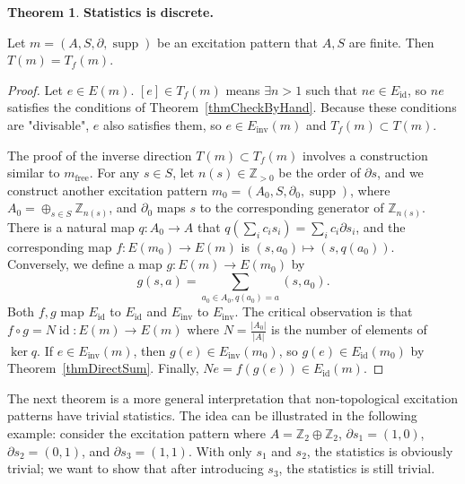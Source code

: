 \documentclass[reprint, amsmath, amssymb, showpacs, floatfix, longbibliography, aps, twocolumn, superscriptaddress, nofootinbib]{revtex4-2}
\newcommand{\ZZ}{{\mathbb Z}}
\newcommand{\supp}{\operatorname{supp}}
\theoremstyle{definition}
\newtheorem{theorem}{Theorem}[section]
\begin{document}
\begin{theorem}\label{thmFiniteOrder}
	\textbf{Statistics is discrete.}
	
	Let $m=(A,S,\partial,\supp)$ be an excitation pattern that $A,S$ are finite. Then $T(m)=T_f(m)$.
\end{theorem}
\begin{proof}
	Let $e\in E(m)$. $[e]\in T_f(m)$ means $\exists n>1$ such that $ne\in E_{\operatorname{id}}$, so $ne$ satisfies the conditions of Theorem~\ref{thmCheckByHand}. Because these conditions are "divisable", $e$ also satisfies them, so $e\in E_{\operatorname{inv}}(m)$ and $T_f(m)\subset T(m)$.
	
	The proof of the inverse direction $T(m)\subset T_f(m)$ involves a construction similar to $m_{\operatorname{free}}$. For any $s\in S$, let $n(s)\in \ZZ_{>0}$ be the order of $\partial s$, and we construct another excitation pattern $m_0=(A_0,S,\partial_0,\supp)$, where $A_0=\oplus_{s\in S}\ZZ_{n(s)}$, and $\partial_0$ maps $s$ to the corresponding generator of $\ZZ_{n(s)}$.  There is a natural map $q:A_0\rightarrow A$ that $q(\sum_ic_is_i)=\sum_ic_i\partial s_i$, and the corresponding map $f:E(m_0)\rightarrow E(m)$ is $(s,a_0)\mapsto(s,q(a_0))$. Conversely, we define a map $g: E(m)\rightarrow E(m_0)$ by
	\begin{equation}
		g(s,a)=\sum_{a_0\in A_0,q(a_0)=a}(s,a_0).
	\end{equation}
	 Both $f,g$ map $E_{\operatorname{id}}$ to $E_{\operatorname{id}}$ and $E_{\operatorname{inv}}$ to $E_{\operatorname{inv}}$. The critical observation is that $f\circ g=N\operatorname{id}: E(m)\rightarrow E(m)$ where $N=\frac{|A_0|}{|A|}$ is the number of elements of $\operatorname{ker}q$. If $e\in E_{\operatorname{inv}}(m)$, then $g(e)\in E_{\operatorname{inv}}(m_0)$, so $g(e)\in E_{\operatorname{id}}(m_0)$ by Theorem~\ref{thmDirectSum}. Finally, $Ne=f(g(e))\in E_{\operatorname{id}}(m)$.
	
\end{proof}

The next theorem is a more general interpretation that non-topological excitation patterns have trivial statistics. The idea can be illustrated in the following example: consider the excitation pattern \hbox{}
where $A=\ZZ_2\oplus\ZZ_2$, $\partial s_1=(1,0)$, $\partial s_2=(0,1)$, and $\partial s_3=(1,1)$. With only $s_1$ and $s_2$, the statistics is obviously trivial; we want to show that after introducing $s_3$, the statistics is still trivial. 
\end{document}
